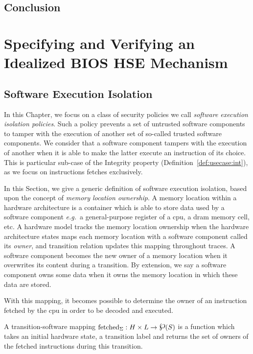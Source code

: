 \section{Conclusion}

\chapter{Specifying and Verifying an Idealized BIOS HSE Mechanism}

\section{Software Execution Isolation}

In this Chapter, we focus on a class of security policies we call \emph{software
  execution isolation policies}.
%
Such a policy prevents a set of untrusted software components to tamper with the
execution of another set of so-called trusted software components.
%
We consider that a software component tampers with the execution of another when
it is able to make the latter execute an instruction of its choice.
%
This is particular sub-case of the Integrity property
(Definition~\ref{def:usecase:int}), as we focus on instructions fetches
exclusively.

In this Section, we give a generic definition of software execution isolation,
based upon the concept of \textit{memory location ownership}.
%
A memory location within a hardware architecture is a container which is able to
store data used by a software component \emph{e.g.}~a general-purpose register
of a \ac{cpu}, a \ac{dram} memory cell, etc.
%
A hardware model tracks the memory location ownership when the hardware
architecture states maps each memory location with a software component called
its \emph{owner}, and transition relation updates this mapping throughout
traces.
%
A software component becomes the new owner of a memory location when it
overwrites its content during a transition.
%
By extension, we say a software component owns some data when it owns the memory
location in which these data are stored.

With this mapping, it becomes possible to determine the owner of an instruction
fetched by the \ac{cpu} in order to be decoded and executed.

\begin{definition}
  \label{def:minx86:transsoft}
  A transition-software mapping
  $\func{fetched}_{\Sigma}: H \times L \rightarrow \powerset(S)$ is a function
  which takes an initial hardware state, a transition label and returns the set
  of owners of the fetched instructions during this transition.
\end{definition}

